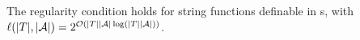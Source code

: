 

\begin{lemma}\label{lem-2pt}
The  regularity condition  \prerec{} holds for string functions definable in \PPT{}s, with $\ell(|T|, |\mathcal{A}|) = 2^{\mathcal{O}(|T||\mathcal{A}|\log (|T||\mathcal{A}|))}$. %
\end{lemma}

